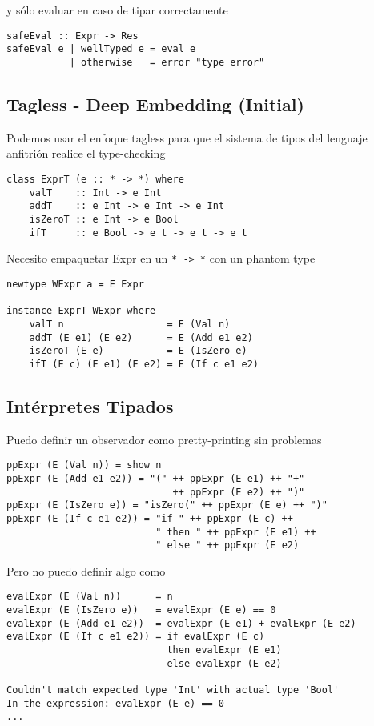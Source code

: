 \documentclass{article}
\newcommand{\imp}[1]{\textcolor{color1}{#1}}
\begin{document}
y sólo evaluar en caso de tipar correctamente

\begin{lstlisting}
safeEval :: Expr -> Res
safeEval e | wellTyped e = eval e
           | otherwise   = error "type error"
\end{lstlisting}

\subsection{Tagless - Deep Embedding (Initial)}

Podemos usar el enfoque \imp{tagless} para que el sistema de tipos del lenguaje anfitrión realice el type-checking
\begin{lstlisting}
class ExprT (e :: * -> *) where
    valT    :: Int -> e Int
    addT    :: e Int -> e Int -> e Int
    isZeroT :: e Int -> e Bool
    ifT     :: e Bool -> e t -> e t -> e t
\end{lstlisting}

Necesito empaquetar Expr en un \texttt{* -> *} con un \imp{phantom type}

\begin{lstlisting}
newtype WExpr a = E Expr

instance ExprT WExpr where
    valT n                  = E (Val n)
    addT (E e1) (E e2)      = E (Add e1 e2)
    isZeroT (E e)           = E (IsZero e)
    ifT (E c) (E e1) (E e2) = E (If c e1 e2)
\end{lstlisting}

\subsection{Intérpretes Tipados}

Puedo definir un observador como pretty-printing sin problemas

\begin{lstlisting}
ppExpr (E (Val n)) = show n
ppExpr (E (Add e1 e2)) = "(" ++ ppExpr (E e1) ++ "+"
                             ++ ppExpr (E e2) ++ ")"
ppExpr (E (IsZero e)) = "isZero(" ++ ppExpr (E e) ++ ")"
ppExpr (E (If c e1 e2)) = "if " ++ ppExpr (E c) ++ 
                          " then " ++ ppExpr (E e1) ++ 
                          " else " ++ ppExpr (E e2)
\end{lstlisting}

Pero no puedo definir algo como

\begin{lstlisting}
evalExpr (E (Val n))      = n
evalExpr (E (IsZero e))   = evalExpr (E e) == 0
evalExpr (E (Add e1 e2))  = evalExpr (E e1) + evalExpr (E e2)
evalExpr (E (If c e1 e2)) = if evalExpr (E c)
                            then evalExpr (E e1)
                            else evalExpr (E e2)
                            
Couldn't match expected type 'Int' with actual type 'Bool'
In the expression: evalExpr (E e) == 0
...
\end{lstlisting}
\end{document}
